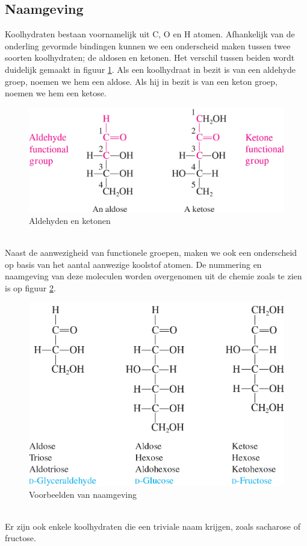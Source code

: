 \documentclass[a4paper,kul]{kulakarticle} %
\begin{document}
\subsection{Naamgeving}
Koolhydraten bestaan voornamelijk uit C, O en H atomen. Afhankelijk van de onderling gevormde bindingen kunnen we een onderscheid maken tussen twee soorten koolhydraten; de aldosen en ketonen. Het verschil tussen beiden wordt duidelijk gemaakt in figuur \ref{fig:aldehyde-keton}. Als een koolhydraat in bezit is van een aldehyde groep, noemen we hem een aldose. Als hij in bezit is van een keton groep, noemen we hem een ketose.
\begin{figure}[htbp]
	\centering
	\includegraphics[width=0.7\linewidth]{Aldehyde-Keton}
	\caption[Aldehyden en ketonen]{Aldehyden en ketonen}
	\label{fig:aldehyde-keton}
\end{figure}\\
Naast de aanwezigheid van functionele groepen, maken we ook een onderscheid op basis van het aantal aanwezige koolstof atomen. De nummering en naamgeving van deze moleculen worden overgenomen uit de chemie zoals te zien is op figuur \ref{fig:examples-name}.
\begin{figure}[htbp]
	\centering
	\includegraphics[width=0.6\linewidth]{examples-name}
	\caption[Naamgeving]{Voorbeelden van naamgeving}
	\label{fig:examples-name}
\end{figure}\\
Er zijn ook enkele koolhydraten die een triviale naam krijgen, zoals sacharose of fructose.
\end{document}
